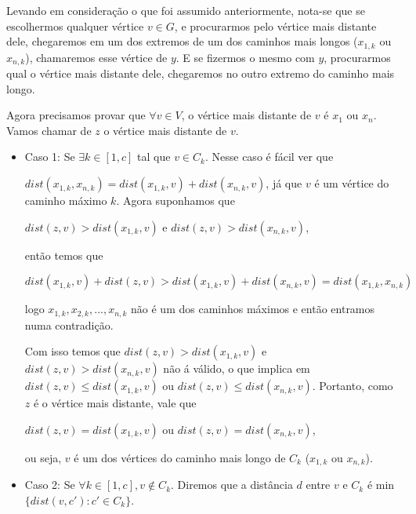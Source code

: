 \documentclass[a4paper,12pt]{article}
\begin{document}
        Levando em consideração o que foi assumido anteriormente,
        nota-se que se escolhermos 
        qualquer vértice $v \in G$, e procurarmos pelo vértice mais
        distante dele, chegaremos em um dos extremos de um dos 
        caminhos mais longos ($x_{1, k}$ 
        ou $x_{n, k}$), chamaremos esse vértice de $y$.
        E se fizermos o mesmo com $y$, procurarmos qual o vértice 
        mais distante dele, chegaremos no
        outro extremo do caminho mais longo.
        

        Agora precisamos provar que $\forall v \in V$, o vértice 
        mais distante
        de $v$ é $x_1$ ou $x_n$.
        Vamos chamar de $z$ o vértice mais distante de $v$.
        

        \begin{itemize}
            \item Caso 1: Se $\exists k \in [1, c]$ tal que 
            $v \in C_k$.
            Nesse caso é fácil ver que 

            $dist(x_{1, k}, x_{n, k})=
            dist(x_{1, k}, v)+dist(x_{n, k}, v)$, 
            já que $v$ é um vértice do caminho máximo $k$.
            Agora suponhamos que 

            $dist(z, v)>dist(x_{1, k}, v)$ e 
            $dist(z, v)>dist(x_{n, k}, v)$,
            
            então temos que 
            
            $dist(x_{1, k}, v)+dist(z, v)>
            dist(x_{1, k}, v)+dist(x_{n, k}, v)=
            dist(x_{1, k}, x_{n, k})$
            
            logo $x_{1, k}, x_{2, k},..., x_{n, k}$ não é um dos 
            caminhos máximos e então entramos numa contradição.

            Com isso temos que 
            $dist(z, v)>dist(x_{1, k}, v)$ e 
            $dist(z, v)>dist(x_{n, k}, v)$ não á válido, o que 
            implica em $dist(z, v)\le dist(x_{1, k}, v)$ ou 
            $dist(z, v)\le dist(x_{n, k}, v)$. 
            Portanto, como $z$ é o vértice mais distante, vale que
            
            $dist(z, v)=dist(x_{1, k}, v)$ ou 
            $dist(z, v)=dist(x_{n, k}, v)$,
            
            ou seja, $v$ é um dos vértices do caminho mais longo
            de $C_k$ ($x_{1, k}$ ou $x_{n, k}$).

            \item Caso 2: Se $\forall k \in [1, c], v \notin C_k$. 
            Diremos que a distância $d$ entre $v$ e $C_k$ é 
            min$\{dist(v, c'): c'\in C_k\}$.


\end{itemize}
\end{document}
